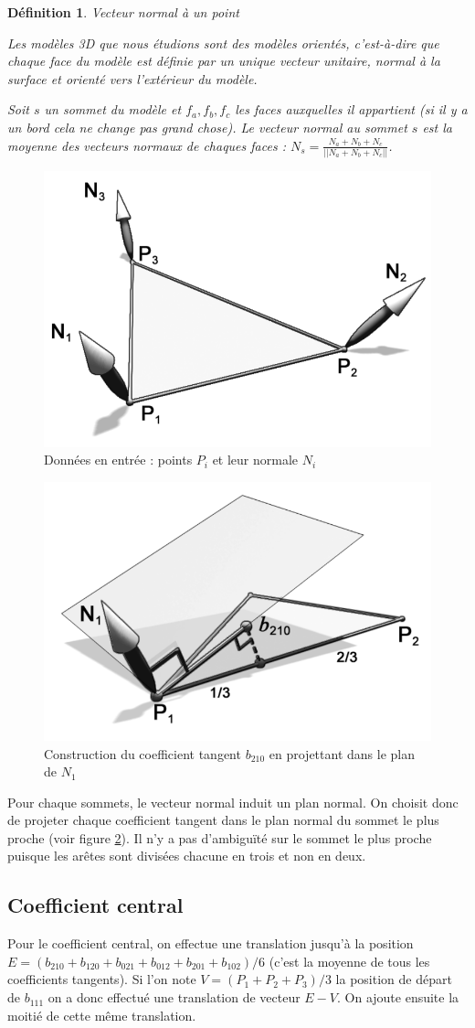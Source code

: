 \documentclass{article}
\newtheorem{definition}{Définition}
\begin{document}
\begin{definition}{Vecteur normal à un point}

Les modèles 3D que nous étudions sont des modèles orientés, c'est-à-dire que
chaque face du modèle est définie par un unique vecteur unitaire, normal à la
surface et orienté vers l'extérieur du modèle.

Soit $s$ un sommet du modèle et $f_a,f_b,f_c$ les faces auxquelles il
appartient (si il y a un bord cela ne change pas grand chose). Le vecteur
normal au sommet $s$ est la moyenne des vecteurs normaux de chaques faces :
$N_s = \frac{N_a + N_b + N_c}{||N_a + N_b + N_c||}$.
\end{definition}

\begin{figure}[ht!]
\centering
    \includegraphics[width=0.4\linewidth]{normals}
    \caption{Données en entrée : points $P_i$ et leur normale $N_i$}
    \label{fig:normals}
\end{figure}

\begin{figure}[ht!]
\centering
    \includegraphics[width=0.4\linewidth]{tangent}
    \caption{Construction du coefficient tangent $b_210$ en projettant dans le
plan de $N_1$}
    \label{fig:tangent}
\end{figure}

Pour chaque sommets, le vecteur normal induit un plan normal. On choisit donc
de projeter chaque coefficient tangent dans le plan normal du sommet le plus
proche (voir figure \ref{fig:tangent}). Il n'y a pas d’ambiguïté sur le sommet
le plus proche puisque les arêtes sont divisées chacune en trois et non en
deux.

\subsection{Coefficient central}
Pour le coefficient central, on effectue une translation jusqu'à la position
$E=(b_{210} + b_{120} + b_{021} + b_{012} + b_{201} + b_{102})/6$ (c'est la
moyenne de tous les coefficients tangents). Si l'on note $V=(P_1 + P_2 +
P_3)/3$ la position de départ de $b_{111}$ on a donc effectué une translation
de vecteur $E-V$. On ajoute ensuite la moitié de cette même translation.
\end{document}
